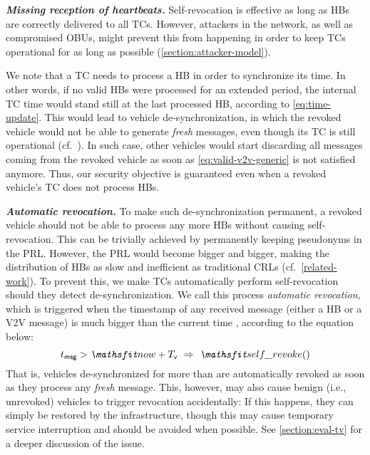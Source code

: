 \noindent\textbf{\emph{Missing reception of heartbeats.}}
%
Self-revocation is effective as long as \acp{HB} are correctly delivered to all
\acp{TC}. However, attackers in the network, as well as compromised \acp{OBU},
might prevent this from happening in order to keep \acp{TC} operational for as
long as possible (\cref{section:attacker-model}).

We note that a \ac{TC} needs to process a \ac{HB} in order to synchronize its
time. In other words, if no valid \acp{HB} were processed for an extended
period, the internal \ac{TC} time \funcnow{} would stand still at the last
processed \ac{HB}, according to \cref{eq:time-update}. This would lead to
vehicle de-synchronization, in which the revoked vehicle would not be able to
generate \emph{fresh} messages, even though its \ac{TC} is still operational
(cf.~). In such case, other vehicles would start discarding
all messages coming from the revoked vehicle as soon as
\cref{eq:valid-v2v-generic} is not satisfied anymore. Thus, our security
objective is guaranteed even when a revoked vehicle's \ac{TC} does not process
\acp{HB}.

\noindent\textbf{\emph{Automatic revocation.}}
%
To make such de-synchronization permanent, a revoked vehicle should not be able
to process any more \acp{HB} without causing self-revocation. This can be
trivially achieved by permanently keeping pseudonyms in the \ac{PRL}. However,
the \ac{PRL} would become bigger and bigger, making the distribution of \acp{HB}
as slow and inefficient as traditional \acp{CRL} (cf.~\cref{related-work}). To
prevent this, we make \acp{TC} automatically perform self-revocation should they
detect de-synchronization. We call this process \emph{automatic revocation},
which is triggered when the timestamp \paramtmsg{} of any received message
(either a \ac{HB} or a \ac{V2V} message) is much bigger than the current time
\funcnow, according to the equation below:
%
\begin{equation}
    \label{eq:auto-rev}
    \paramtmsg{} > \funcnow{} + \paramtt{} \ \Rightarrow\  \funcselfrevoke{}
\end{equation}
%
That is, vehicles de-synchronized for more than \paramtt{} are automatically
revoked as soon as they process any \emph{fresh} message. This, however, may
also cause benign (i.e., unrevoked) vehicles to trigger revocation accidentally:
If this happens, they can simply be restored by the infrastructure, though this
may cause temporary service interruption and should be avoided when possible.
See \cref{section:eval-tv} for a deeper discussion of the issue.

